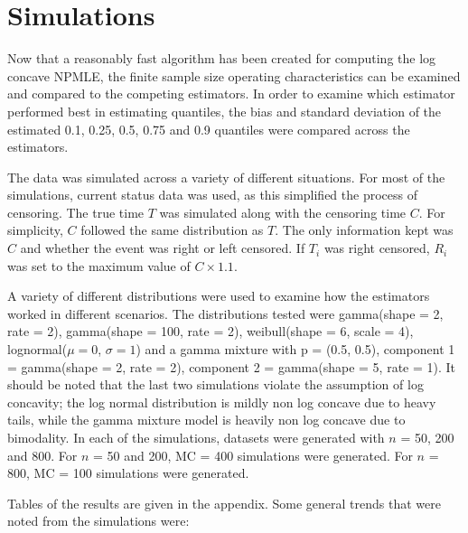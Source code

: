 \documentclass[10pt]{article}
\begin{document}
	
	{\section{Simulations} } 
	
	Now that a reasonably fast algorithm has been created for computing the log concave NPMLE, the finite sample size operating characteristics can be examined and compared to the competing estimators. In order to examine which estimator performed best in estimating quantiles, the bias and standard deviation of the estimated 0.1, 0.25, 0.5, 0.75 and 0.9 quantiles were compared across the estimators. 
			
	The data was simulated across a variety of different situations. For most of the simulations, current status data was used, as this simplified the process of censoring. The true time $T$ was simulated along with the censoring time $C$. For simplicity, $C$ followed the same distribution as $T$. The only information kept was $C$ and whether the event was right or left censored. If $T_i$ was right censored, $R_i$ was set to the maximum value of $C \times 1.1$.

	A variety of different distributions were used to examine how the estimators worked in different scenarios. The distributions tested were gamma(shape = 2, rate = 2), gamma(shape = 100, rate = 2), weibull(shape = 6, scale = 4),  lognormal($\mu = 0$, $\sigma = 1$) and a gamma mixture with p = (0.5, 0.5), component 1 = gamma(shape = 2, rate = 2), component 2 = gamma(shape = 5, rate = 1). It should be noted that the last two simulations violate the assumption of log concavity; the log normal distribution is mildly non log concave due to heavy tails, while the gamma mixture model is heavily non log concave due to bimodality. In each of the simulations, datasets were generated with $n$ = 50, 200 and 800. For $n$ = 50 and 200, MC = 400 simulations were generated. For $n$ = 800, MC = 100 simulations were generated.
	
	Tables of the results are given in the appendix. Some general trends that were noted from the simulations were:
	
\vspace{3mm}	
	
\end{document}
